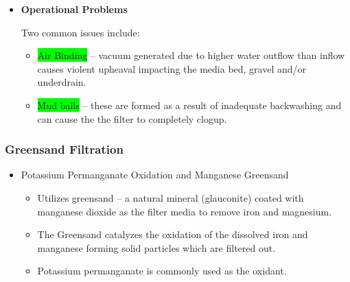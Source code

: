\begin{itemize}
\item \textbf{Operational Problems}

Two common issues include:

\begin{itemize}

 







\item \colorbox{lime}{Air Binding} – vacuum generated due to higher water outflow than inflow causes violent upheaval impacting the media bed, gravel and/or underdrain.

 

\item \colorbox{lime}{Mud balls} – these are formed as a result of inadequate backwashing and can cause the the filter to completely clogup.

\end{itemize}
\end{itemize}

\subsubsection{Greensand Filtration}
\begin{itemize}
\item Potassium Permanganate Oxidation and Manganese Greensand
\begin{itemize}
\item Utilizes greensand – a natural mineral (glauconite) coated with manganese dioxide as the filter media to remove iron and magnesium.
\item The Greensand catalyzes the oxidation of the dissolved iron and manganese forming solid particles which are filtered out.
\item Potassium permanganate is commonly used as the oxidant.
\end{itemize}
\end{itemize}
